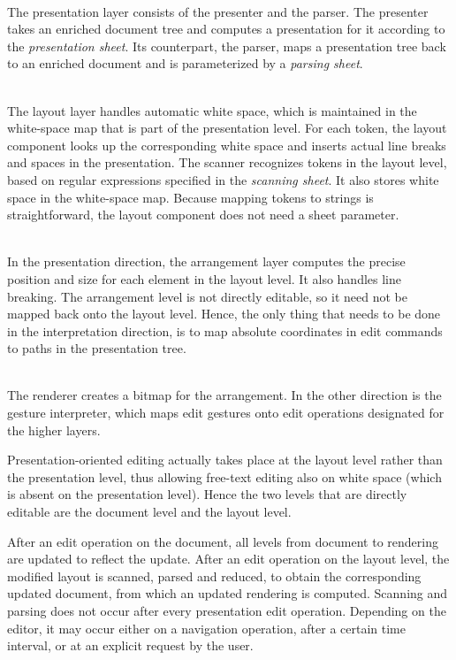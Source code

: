 \documentclass[10pt]{article}
\begin{document}
\\
The presentation layer consists of the presenter and the parser. The presenter takes an enriched document tree and computes a presentation for it according to the {\em presentation sheet}. Its counterpart, the parser, maps a presentation tree back to an enriched document and is parameterized by a {\em parsing sheet}.

\\
The layout layer handles automatic white space, which is maintained in the white-space map that is part of the presentation level. For each token, the layout component looks up the corresponding white space and inserts actual line breaks and spaces in the presentation. The scanner recognizes tokens in the layout level, based on regular expressions specified in the {\em scanning sheet}. It also stores white space in the white-space map. Because mapping tokens to strings is straightforward, the layout component does not need a sheet parameter.

\\
In the presentation direction, the arrangement layer computes the precise position and size for each element in the layout level. It also handles line breaking. The arrangement level is not directly editable, so it need not be mapped back onto the layout level. Hence, the only thing that needs to be done in the interpretation direction, is to map absolute coordinates in edit commands to paths in the presentation tree. 

\\
The renderer creates a bitmap for the arrangement. In the other direction is the gesture interpreter, which maps edit gestures onto edit operations designated for the higher layers.

\ec




\bc
Presentation-oriented editing actually takes place at the layout level rather than the presentation level, thus allowing free-text editing also on white space (which is absent on the presentation level). Hence the two levels that are directly editable are the document level and the layout level. 
\ec

After an edit operation on the document, all levels from document to rendering are updated to reflect the update. After an edit operation on the layout level, the modified layout is scanned, parsed and reduced, to obtain the corresponding updated document, from which an updated rendering is computed. Scanning and parsing does not occur after every presentation edit operation. Depending on the editor, it may occur either on a navigation operation, after a certain time interval, or at an explicit request by the user.
\end{document}
